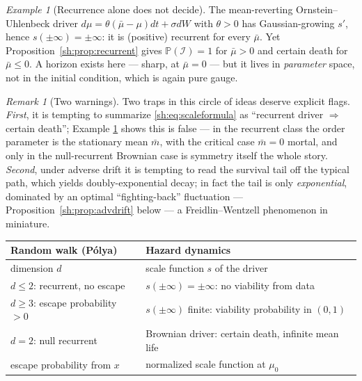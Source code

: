 \documentclass[11pt]{article}
\numberwithin{equation}{section}
\theoremstyle{plain}
\theoremstyle{definition}
\theoremstyle{remark}
\newtheorem{remark}[theorem]{Remark}
\newtheorem{example}[theorem]{Example}
\newcommand{\PP}{\mathbb{P}}
\newcommand{\Imm}{\mathcal{I}}
\begin{document}
\begin{example}[Recurrence alone does not decide]\label{sh:ex:recurrentcounter}
The mean-reverting Ornstein--Uhlenbeck driver
$d\mu=\theta(\bar\mu-\mu)dt+\sigma dW$ with $\theta>0$ has Gaussian-growing
$s'$, hence $s(\pm\infty)=\pm\infty$: it is (positive) recurrent for every
$\bar\mu$. Yet Proposition~\ref{sh:prop:recurrent} gives
$\PP(\Imm)=1$ for $\bar\mu>0$ and certain death for $\bar\mu\le0$. A
horizon exists here --- sharp, at $\bar\mu=0$ --- but it lives in
\emph{parameter} space, not in the initial condition, which is again pure
gauge.
\end{example}

\begin{remark}[Two warnings]\label{sh:rem:warnings}
Two traps in this circle of ideas deserve explicit flags.
\emph{First}, it is tempting to summarize \eqref{sh:eq:scaleformula} as
``recurrent driver $\Rightarrow$ certain death''; Example
\ref{sh:ex:recurrentcounter} shows this is false --- in the recurrent class
the order parameter is the stationary mean $\bar m$, with the critical case
$\bar m=0$ mortal, and only in the null-recurrent Brownian case is
symmetry itself the whole story.
\emph{Second}, under adverse drift it is tempting to read the survival tail
off the typical path, which yields doubly-exponential decay; in fact the
tail is only \emph{exponential}, dominated by an optimal ``fighting-back''
fluctuation --- Proposition~\ref{sh:prop:advdrift} below --- a
Freidlin--Wentzell phenomenon in miniature.
\end{remark}

\begin{center}
\begin{tabular}{@{}ll@{}}
\toprule
\textbf{Random walk (P\'olya)} & \textbf{Hazard dynamics}\\
\midrule
dimension $d$ & scale function $s$ of the driver\\
$d\le2$: recurrent, no escape & $s(\pm\infty)=\pm\infty$: no viability from
data\\
$d\ge3$: escape probability $>0$ & $s(\pm\infty)$ finite: viability
probability in $(0,1)$\\
$d=2$: null recurrent & Brownian driver: certain death, infinite mean
life\\
escape probability from $x$ & normalized scale function at $\mu_0$\\
\bottomrule
\end{tabular}
\end{center}
\end{document}
